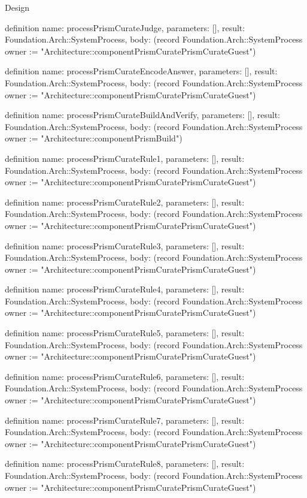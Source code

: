 \begin{lexlean}{Design}
\begin{semanticmodule}
definition{
  name: processPrismCurateJudge,
  parameters: [],
  result: Foundation.Arch::SystemProcess,
  body: (record Foundation.Arch::SystemProcess {owner := "Architecture::componentPrismCuratePrismCurateGuest"})
}

definition{
  name: processPrismCurateEncodeAnswer,
  parameters: [],
  result: Foundation.Arch::SystemProcess,
  body: (record Foundation.Arch::SystemProcess {owner := "Architecture::componentPrismCuratePrismCurateGuest"})
}

definition{
  name: processPrismCurateBuildAndVerify,
  parameters: [],
  result: Foundation.Arch::SystemProcess,
  body: (record Foundation.Arch::SystemProcess {owner := "Architecture::componentPrismBuild"})
}

definition{
  name: processPrismCurateRule1,
  parameters: [],
  result: Foundation.Arch::SystemProcess,
  body: (record Foundation.Arch::SystemProcess {owner := "Architecture::componentPrismCuratePrismCurateGuest"})
}

definition{
  name: processPrismCurateRule2,
  parameters: [],
  result: Foundation.Arch::SystemProcess,
  body: (record Foundation.Arch::SystemProcess {owner := "Architecture::componentPrismCuratePrismCurateGuest"})
}

definition{
  name: processPrismCurateRule3,
  parameters: [],
  result: Foundation.Arch::SystemProcess,
  body: (record Foundation.Arch::SystemProcess {owner := "Architecture::componentPrismCuratePrismCurateGuest"})
}

definition{
  name: processPrismCurateRule4,
  parameters: [],
  result: Foundation.Arch::SystemProcess,
  body: (record Foundation.Arch::SystemProcess {owner := "Architecture::componentPrismCuratePrismCurateGuest"})
}

definition{
  name: processPrismCurateRule5,
  parameters: [],
  result: Foundation.Arch::SystemProcess,
  body: (record Foundation.Arch::SystemProcess {owner := "Architecture::componentPrismCuratePrismCurateGuest"})
}

definition{
  name: processPrismCurateRule6,
  parameters: [],
  result: Foundation.Arch::SystemProcess,
  body: (record Foundation.Arch::SystemProcess {owner := "Architecture::componentPrismCuratePrismCurateGuest"})
}

definition{
  name: processPrismCurateRule7,
  parameters: [],
  result: Foundation.Arch::SystemProcess,
  body: (record Foundation.Arch::SystemProcess {owner := "Architecture::componentPrismCuratePrismCurateGuest"})
}

definition{
  name: processPrismCurateRule8,
  parameters: [],
  result: Foundation.Arch::SystemProcess,
  body: (record Foundation.Arch::SystemProcess {owner := "Architecture::componentPrismCuratePrismCurateGuest"})
}


\end{semanticmodule}
\end{lexlean}
